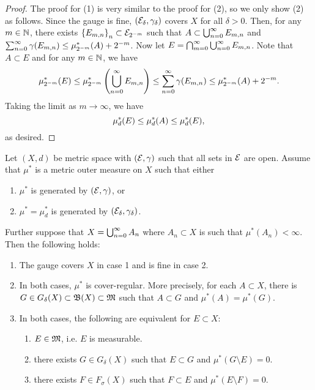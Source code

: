 \documentclass[a4paper]{article}
\begin{document}
\begin{proof}
The proof for (1) is very similar to the proof for (2), 
so we only show (2) as follows.
Since the gauge is fine, $(\mathcal{E}_\delta, \gamma_\delta)$
covers $X$ for all $\delta > 0$. Then, for any $m \in \mathbb{N}$,
there exists $\left\{ E_{m, n} \right\}_{n} \subset 
\mathcal{E}_{2^{-m}}$ such that $A \subset \bigcup_{n=0}^\infty E_{m, n}$ 
and $\sum_{n=0}^\infty \gamma(E_{m, n}) \leq \mu^*_{2^{-m}}(A) + 2^{-m}$. 
Now let $E = \bigcap_{m=0}^\infty \bigcup_{n=0}^\infty E_{m, n}$. Note that 
$A \subset E$ and for any $m \in \mathbb{N}$, we have 
\[
\mu^*_{2^{-m}} (E) \leq \mu^*_{2^{-m}} \left( \bigcup_{n=0}^\infty E_{m, n} \right) 
\leq \sum_{n=0}^\infty \gamma(E_{m, n}) \leq \mu^*_{2^{-m}} (A) + 2^{-m}.
\]
Taking the limit as $m \to \infty$, we have 
\[
\mu^*_d (E) \leq \mu^*_d(A) \leq \mu^*_d(E),
\]
as desired.

\end{proof}

\begin{thm}
  Let $(X, d)$ be metric space with $(\mathcal{E}, \gamma)$ such that
  all sets in $\mathcal{E}$ are open. Assume that $\mu^*$ is a metric 
  outer measure on $X$ such that either 
  
  \begin{enumerate}
    \item $\mu^*$ is generated by $(\mathcal{E}, \gamma)$, or 
    \item $\mu^* = \mu^*_d$ is generated by $(\mathcal{E}_\delta, 
    \gamma_\delta)$.
  \end{enumerate}

  Further suppose that $X = \bigcup_{n=0}^\infty A_n$ where $A_n \subset X$
  is such that $\mu^*(A_n) < \infty$. Then the following holds:

  \begin{enumerate}
    \item The gauge covers $X$ in case 1 and is fine in case 
    2. 
    \item In both cases, $\mu^*$ is cover-regular. More precisely,
    for each $A \subset X$, there is $G \in G_\delta(X) \subset \mathfrak{B}(X)
    \subset \mathfrak{M}$ such that $A \subset G$ and $\mu^*(A) = \mu^*(G)$.
    \item In both cases, the following are equivalent for 
    $E \subset X$: 
    \begin{enumerate}
      \item $E \in \mathfrak{M}$, i.e. $E$ is measurable.
      \item there exists $G \in G_\delta(X)$ such that 
      $E \subset G$ and $\mu^*(G \setminus E) = 0$.
      \item there exists $F \in F_\sigma(X)$ such that 
      $F \subset E$ and $\mu^* (E \setminus F) = 0$.
    \end{enumerate}
  \end{enumerate}
\end{thm}
\end{document}
